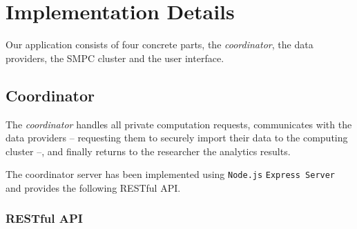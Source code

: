 \chapter{Implementation Details}\label{c:implementation}

Our application consists of four concrete parts, the \textit{coordinator}, the data providers, the SMPC cluster and the user interface.

\section{Coordinator}\label{s:impl-coordinator}
The \textit{coordinator} handles all private computation requests, communicates with the data providers -- requesting them to securely import their data to the computing cluster --, and finally returns to the researcher the analytics results.

The coordinator server has been implemented using \texttt{Node.js} \texttt{Express Server} and provides the following RESTful API.


\subsection{RESTful API}\label{ss:coord-restful-api}

